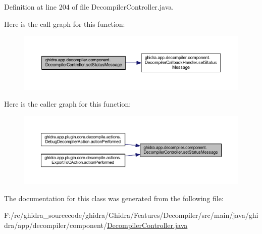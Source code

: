 Definition at line 204 of file Decompiler\+Controller.\+java.

Here is the call graph for this function\+:
\nopagebreak
\begin{figure}[H]
\begin{center}
\leavevmode
\includegraphics[width=350pt]{classghidra_1_1app_1_1decompiler_1_1component_1_1_decompiler_controller_a7f9c30484cff31540728dac99886488e_cgraph}
\end{center}
\end{figure}
Here is the caller graph for this function\+:
\nopagebreak
\begin{figure}[H]
\begin{center}
\leavevmode
\includegraphics[width=350pt]{classghidra_1_1app_1_1decompiler_1_1component_1_1_decompiler_controller_a7f9c30484cff31540728dac99886488e_icgraph}
\end{center}
\end{figure}


The documentation for this class was generated from the following file\+:\begin{DoxyCompactItemize}
\item 
F\+:/re/ghidra\+\_\+sourcecode/ghidra/\+Ghidra/\+Features/\+Decompiler/src/main/java/ghidra/app/decompiler/component/\mbox{\hyperlink{_decompiler_controller_8java}{Decompiler\+Controller.\+java}}\end{DoxyCompactItemize}
